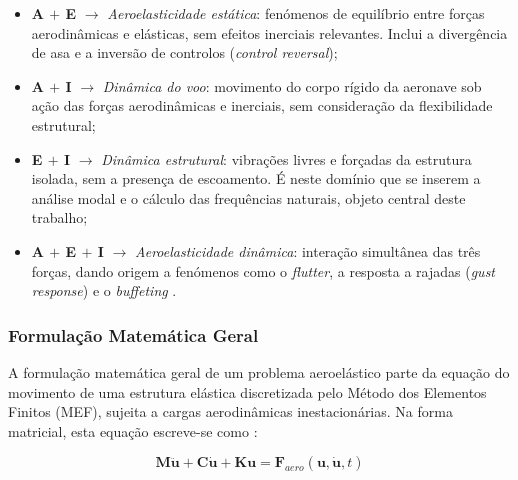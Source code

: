 \documentclass[a4paper,fleqn]{cas-sc}
\begin{document}
\begin{itemize}
    \item \textbf{A $+$ E} $\rightarrow$ \textit{Aeroelasticidade estática}: fenómenos de equilíbrio entre forças aerodinâmicas e elásticas, sem efeitos inerciais relevantes. Inclui a divergência de asa e a inversão de controlos (\textit{control reversal});

    \item \textbf{A $+$ I} $\rightarrow$ \textit{Dinâmica do voo}: movimento do corpo rígido da aeronave sob ação das forças aerodinâmicas e inerciais, sem consideração da flexibilidade estrutural;

    \item \textbf{E $+$ I} $\rightarrow$ \textit{Dinâmica estrutural}: vibrações livres e forçadas da estrutura isolada, sem a presença de escoamento. É neste domínio que se inserem a análise modal e o cálculo das frequências naturais, objeto central deste trabalho;

    \item \textbf{A $+$ E $+$ I} $\rightarrow$ \textit{Aeroelasticidade dinâmica}: interação simultânea das três forças, dando origem a fenómenos como o \textit{flutter}, a resposta a rajadas (\textit{gust response}) e o \textit{buffeting} \cite{Dowell2004, Wright2015}.
\end{itemize}

\subsubsection{Formulação Matemática Geral}

A formulação matemática geral de um problema aeroelástico parte da equação do movimento de uma estrutura elástica discretizada pelo Método dos Elementos Finitos (MEF), sujeita a cargas aerodinâmicas inestacionárias. Na forma matricial, esta equação escreve-se como \cite{Hodges2011, Nastran2014}:

\begin{equation}
    \mathbf{M}\ddot{\mathbf{u}} + \mathbf{C}\dot{\mathbf{u}} + 
    \mathbf{K}\mathbf{u} = \mathbf{F}_{aero}(\mathbf{u}, 
    \dot{\mathbf{u}}, t)
    \label{eq:eom_geral}
\end{equation}
\end{document}
